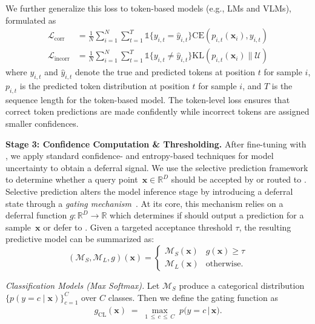 We further generalize this loss to token-based models (e.g., LMs and VLMs), formulated as
\ifarxiv
\small
\fi
\begin{align}
    \mathcal{L}_\text{corr} & = \frac{1}{N} \sum_{i=1}^{N} \sum_{t=1}^{T} \mathds{1}\{ y_{i,t} = \hat{y}_{i,t} \} \text{CE}(p_{i,t}(\mathbf{x}_i), y_{i,t}) \\
    \mathcal{L}_\text{incorr} & = \frac{1}{N} \sum_{i=1}^{N} \sum_{t=1}^{T} \mathds{1}\{ y_{i,t} \neq \hat{y}_{i,t} \} \text{KL}\left(p_{i,t}(\mathbf{x}_i) \parallel \mathcal{U}\right)
\end{align}
\normalsize
where \( y_{i,t} \) and \( \hat{y}_{i,t} \) denote the true and predicted tokens at position \( t \) for sample \( i \), \( p_{i,t} \) is the predicted token distribution at position \( t \) for sample \( i \), and \( T \) is the sequence length for the token-based model. The token-level loss ensures that correct token predictions are made confidently while incorrect tokens are assigned smaller confidences.

\sloppy
\textbf{Stage 3: Confidence Computation \& Thresholding.} After fine-tuning \smallmodel with \loss, we apply standard confidence- and entropy-based techniques for model uncertainty to obtain a deferral signal. We use the selective prediction framework to determine whether a query point~$\mathbf{x} \in \mathbb{R}^D$ should be accepted by \smallmodel or routed to \bigmodel. Selective prediction alters the model inference stage by introducing a deferral state through a \textit{gating mechanism}~\citep{yaniv2010riskcoveragecurve}. At its core, this mechanism relies on a deferral function $g:\mathbb{R}^D \rightarrow \mathbb{R}$ which determines if \smallmodel should output a prediction for a sample~$\mathbf{x}$ or defer to \bigmodel. Given a targeted acceptance threshold $\tau$, the resulting predictive model can be summarized as:
\begin{equation}
\label{eq:deferral}
    (\mathcal{M}_S,\mathcal{M}_L,g)(\mathbf{x}) = \begin{cases}
  \mathcal{M}_S(\mathbf{x})  & g(\mathbf{x}) \geq \tau \\
  \mathcal{M}_L(\mathbf{x}) & \text{otherwise.}
\end{cases}
\end{equation}

\emph{Classification Models (Max Softmax).} Let \(\mathcal{M}_S\) produce a categorical distribution
\(\{p(y=c \mid \mathbf{x})\}_{c=1}^C\) over \(C\) classes. 
Then we define the gating function as
\begin{align}
g_{\text{CL}}(\mathbf{x}) \;=\; \max_{1 \,\le\, c \,\le\, C}\;p\bigl(y = c \,\big\vert\, \mathbf{x}\bigr).
\end{align}

